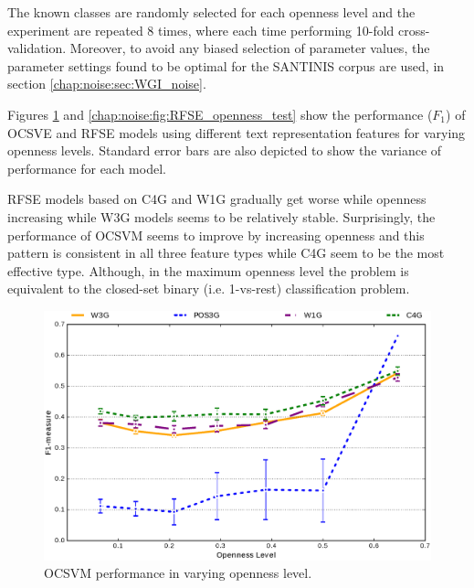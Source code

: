 The known classes are randomly selected for each openness level and the experiment are repeated 8 times, where each time performing 10-fold cross-validation. Moreover, to avoid any biased selection of parameter values, the parameter settings found to be optimal for the SANTINIS corpus are used, in section \ref{chap:noise:sec:WGI_noise}.

Figures \ref{chap:noise:fig:OCSVME_openness_test} and \ref{chap:noise:fig:RFSE_openness_test} show the performance ($F_{1}$) of OCSVE and RFSE models using different text representation features for varying openness levels. Standard error bars are also depicted to show the variance of performance for each model. 

RFSE models based on C4G and W1G gradually get worse while openness increasing while W3G models seems to be relatively stable. Surprisingly, the performance of OCSVM seems to improve by increasing openness and this pattern is consistent in all three feature types while C4G seem to be the most effective type. Although, in the maximum openness level the problem is equivalent to the closed-set binary (i.e. 1-vs-rest) classification problem.

\begin{figure}[t]
\begin{center}
    \includegraphics[scale=0.45]{Figures/OCSVME_openness_test_graph.eps}
	\caption{OCSVM performance in varying openness level.}
	\label{chap:noise:fig:OCSVME_openness_test}
\end{center}
\end{figure}

